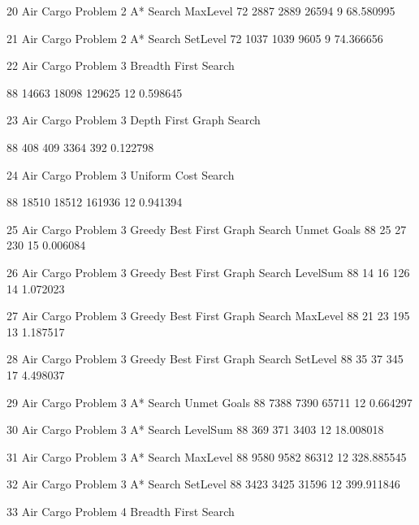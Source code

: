 \documentclass{article}
\begin{document}
    
      20
      Air Cargo Problem 2
      A* Search
      MaxLevel
      72
      2887
      2889
      26594
      9
      68.580995
    
    
      21
      Air Cargo Problem 2
      A* Search
      SetLevel
      72
      1037
      1039
      9605
      9
      74.366656
    
    
      22
      Air Cargo Problem 3
      Breadth First Search
      
      88
      14663
      18098
      129625
      12
      0.598645
    
    
      23
      Air Cargo Problem 3
      Depth First Graph Search
      
      88
      408
      409
      3364
      392
      0.122798
    
    
      24
      Air Cargo Problem 3
      Uniform Cost Search
      
      88
      18510
      18512
      161936
      12
      0.941394
    
    
      25
      Air Cargo Problem 3
      Greedy Best First Graph Search
      Unmet Goals
      88
      25
      27
      230
      15
      0.006084
    
    
      26
      Air Cargo Problem 3
      Greedy Best First Graph Search
      LevelSum
      88
      14
      16
      126
      14
      1.072023
    
    
      27
      Air Cargo Problem 3
      Greedy Best First Graph Search
      MaxLevel
      88
      21
      23
      195
      13
      1.187517
    
    
      28
      Air Cargo Problem 3
      Greedy Best First Graph Search
      SetLevel
      88
      35
      37
      345
      17
      4.498037
    
    
      29
      Air Cargo Problem 3
      A* Search
      Unmet Goals
      88
      7388
      7390
      65711
      12
      0.664297
    
    
      30
      Air Cargo Problem 3
      A* Search
      LevelSum
      88
      369
      371
      3403
      12
      18.008018
    
    
      31
      Air Cargo Problem 3
      A* Search
      MaxLevel
      88
      9580
      9582
      86312
      12
      328.885545
    
    
      32
      Air Cargo Problem 3
      A* Search
      SetLevel
      88
      3423
      3425
      31596
      12
      399.911846
    
    
      33
      Air Cargo Problem 4
      Breadth First Search
      
\end{document}
